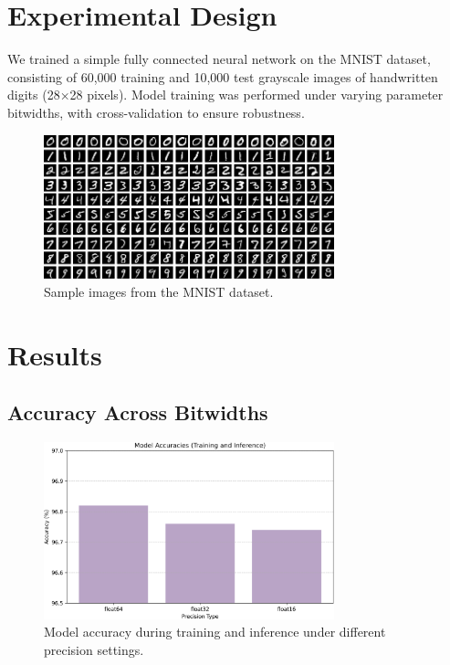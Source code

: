 \documentclass[11pt]{article}
\begin{document}
	\section{Experimental Design}

	We trained a simple fully connected neural network on the MNIST dataset, consisting of 60,000 training and 10,000 test grayscale images of handwritten digits (28×28 pixels). Model training was performed under varying parameter bitwidths, with cross-validation to ensure robustness.

	\begin{figure}[H]
    	\centering
    	\includegraphics[width=0.75\textwidth]{figures/mnist.png}
    	\caption{Sample images from the MNIST dataset.}
	\end{figure}

	\section{Results}

	\subsection*{Accuracy Across Bitwidths}

	\begin{figure}[H]
    	\centering
    	\includegraphics[width=0.75\textwidth]{figures/trainingAndInference.png}
    	\caption{Model accuracy during training and inference under different precision settings.}
	\end{figure}
\end{document}
